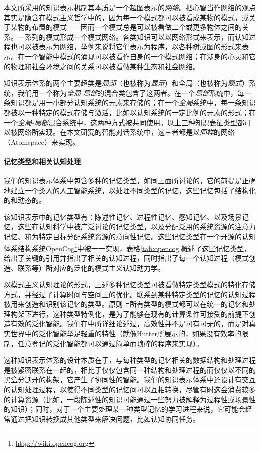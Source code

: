 本文所采用的知识表示机制其本质是一个超图表示的{\it 网络}。把心智当作网络的观点其实是隐含在模式主义哲学中的，因为每一个模式都可以被看成某物的模式，或关于某物的布置的模式——因而一个模式总是可以被看做二个或更多物体之间的关系。一系列的模式形成一个模式网络。各类知识可以以网络形式来表示，而认知过程也可以被表示为网络，举例来说将它们表示为程序，以各种树或图的形式来表示。在一个智能中模式的涌现可以被看作自身的一个模式网络；在涉身的心灵和它的物理和社会环境之间的关系可以被看做某种生态和社会网络。

知识表示体系的两个主要超类是{\it 局部}（也被称为{\it 显示}）和全局（也被称为{\it 隐式}）系统，我们用一个称为{\it 全局-局部}的混合类包含了这两者。在一个{\it 局部}系统中，每一条知识都是用一小部分认知系统的元素来存储的；在一个{\it 全局}系统中，每一条知识都被以一种特定的模式存储与激活，比如以认知系统的一定比例的元素的形式；在一个{\it 全局-局部}混合系统中，这两种方式被共同使用。以上三种知识表征类型都可以被网络所实现。在本文研究的智能对话系统中，这三者都是以{\it 同样}的网络（Atomspace）来实现。

\paragraph{记忆类型和相关认知处理}

我们的知识表示体系中包含多种的记忆类型，如同上面所讨论的，它的前提是正确地建立一个类人的人工智能系统，以处理不同类型的记忆，这些记忆包括了结构化的和动态的。

该知识表示中的记忆类型有：陈述性记忆、过程性记忆、感知记忆、以及场景记忆，这些在认知科学中被广泛讨论\cite{Tulving2005}的记忆类型，以及分配泛用的系统资源的注意力记忆、和为特定目标分配系统资源的意向性记忆。这些记忆类型在一个开源的认知体系结构系统OpenCog\footnote {\url{http://wiki.opencog.org}}中被一一实现，表格\ref{tab:opencog}概述了这些记忆类型，给出了关键的引用并指出了相关的认知过程，同时指出了每一个认知过程（模式创造、联系等）所对应的泛化的模式主义认知动力学。

以模式主义认知理论的形式，上述多种记忆类型可被看做特定类型模式的特化存储方式，并经过了计算时间与空间上的优化。联系到某种特定类型的记忆的认知过程被用来创造和识别该记忆的类型。原则上所有类型的模式都可以在统一的记忆和处理构架下进行，这种类型特例化，是为了能够在现有的计算条件可接受的前提下创造有效的泛化智能。我们在\cite{Goertzel2010c}中所详细论述过，高效性并不是可有可无的，而是对真实世界中的泛化智能举足轻重的特性（就像Hutter所展示的，如果没有效率的限制，任意登记的泛化智能都可以通过简单而琐碎的程序来实现）。

这种知识表示体系的设计本质在于，与每种类型的记忆相关的数据结构和处理过程是被紧密联系在一起的，相比于仅仅包含同一种结构和处理过程的而仅仅以不同的黑盒分割开的构架，它产生了协同性的智能。我们的知识表示体系中还设计有交互的认知处理过程，以使得不同类型的记忆间可以互相转换，尽管有时这会消费较多的计算资源（比如，一段陈述性的知识可能通过一些努力被解释为过程性或场景性的知识）；同时，对于一个主要处理某一种类型记忆的学习进程来说，它可能会经常通过把知识转换成其他类型来解决问题，比如认知协同任务。

